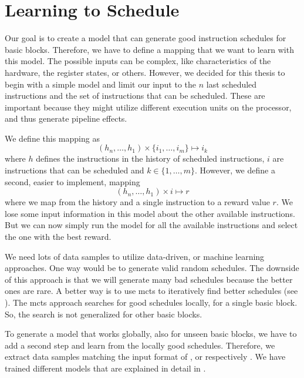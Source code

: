 \section{Learning to Schedule}
\label{sec:approach:ml}
Our goal is to create a model that can generate good instruction schedules for basic blocks.
Therefore, we have to define a mapping that we want to learn with this model.
The possible inputs can be complex, like characteristics of the hardware, the register states, or others.
However, we decided for this thesis to begin with a simple model and limit our input to the $n$ last scheduled instructions and the set of instructions that can be scheduled.
These are important because they might utilize different execution units on the processor, and thus generate pipeline effects.

We define this mapping as
\begin{equation}
    (h_n, \ldots, h_1) \times \{i_1, \ldots, i_m\} \mapsto i_k
    \label{eqn:mlmapping1}
\end{equation}
where $h$ defines the instructions in the history of scheduled instructions, $i$ are instructions that can be scheduled and $k \in \{1, \ldots, m\}$.
However, we define a second, easier to implement, mapping
\begin{equation}
    (h_n, \ldots, h_1) \times i \mapsto r
    \label{eqn:mlmapping2}
\end{equation}
where we map from the history and a single instruction to a reward value $r$.
We lose some input information in this model about the other available instructions.
But we can now simply run the model for all the available instructions and select the one with the best reward.

We need lots of data samples to utilize data-driven, or machine learning approaches.
One way would be to generate valid random schedules.
The downside of this approach is that we will generate many bad schedules because the better ones are rare.
A better way is to use \ac{mcts} to iteratively find better schedules (see ).
The \ac{mcts} approach searches for good schedules locally, \ie for a single basic block.
So, the search is not generalized for other basic blocks.

To generate a model that works globally, \ie also for unseen basic blocks, we have to add a second step and learn from the locally good schedules.
Therefore, we extract data samples matching the input format of , or respectively .
We have trained different models that are explained in detail in .

